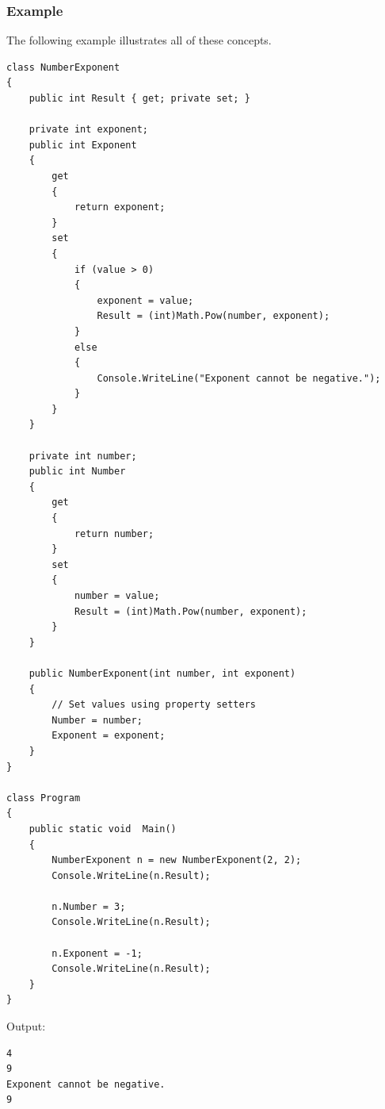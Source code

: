 \documentclass{article}
\begin{document}
\subsubsection{Example}
The following example illustrates all of these concepts.
\begin{verbatim}
class NumberExponent
{
    public int Result { get; private set; }

    private int exponent;
    public int Exponent
    {
        get
        {
            return exponent;
        }
        set
        {
            if (value > 0)
            {
                exponent = value;
                Result = (int)Math.Pow(number, exponent);
            }
            else
            {
                Console.WriteLine("Exponent cannot be negative.");
            }
        }
    }

    private int number;
    public int Number
    {
        get
        {
            return number;
        }
        set
        {
            number = value;
            Result = (int)Math.Pow(number, exponent);
        }
    }

    public NumberExponent(int number, int exponent)
    {
        // Set values using property setters
        Number = number;
        Exponent = exponent;
    }
}

class Program
{
    public static void  Main()
    {
        NumberExponent n = new NumberExponent(2, 2);
        Console.WriteLine(n.Result);

        n.Number = 3;
        Console.WriteLine(n.Result);

        n.Exponent = -1;
        Console.WriteLine(n.Result);
    }
}
\end{verbatim}
Output:
\begin{verbatim}
4
9
Exponent cannot be negative.
9
\end{verbatim}
\end{document}
